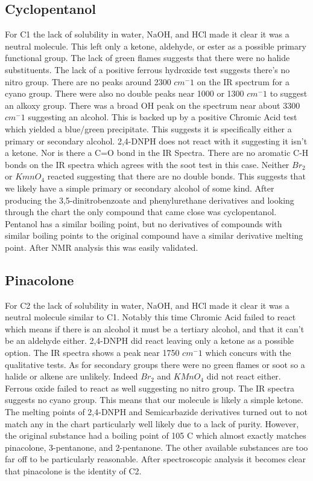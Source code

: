 \documentclass{article}
\begin{document}
	\subsection{Cyclopentanol}
	For C1 the lack of solubility in water, NaOH, and HCl made it clear it was a neutral molecule. This left only a ketone, aldehyde, or ester as a possible primary functional group. The lack of green flames suggests that there were no halide substituents. The lack of a positive ferrous hydroxide test suggests there's no nitro group. There are no peaks around 2300 $cm^-1$ on the IR spectrum for a cyano group. There were also no double peaks near 1000 or 1300 $cm^-1$ to suggest an alkoxy group. There was a broad OH peak on the spectrum near about 3300 $cm^-1$ suggesting an alcohol. This is backed up by a positive Chromic Acid test which yielded a blue/green precipitate. This suggests it is specifically either a primary or secondary alcohol. 2,4-DNPH does not react with it suggesting it isn't a ketone. Nor is there a C=O bond in the IR Spectra. There are no aromatic C-H bonds on the IR spectra which agrees with the soot test in this case. Neither $Br_2$ or $KmnO_4$ reacted suggesting that there are no double bonds. This suggests that we likely have a simple primary or secondary alcohol of some kind. After producing the 3,5-dinitrobenzoate and phenylurethane derivatives and looking through the chart the only compound that came close was cyclopentanol. Pentanol has a similar boiling point, but no derivatives of compounds with similar boiling points to the original compound have a similar derivative melting point. After NMR analysis this was easily validated.
	
	\subsection{Pinacolone}
	For C2 the lack of solubility in water, NaOH, and HCl made it clear it was a neutral molecule similar to C1. Notably this time Chromic Acid failed to react which means if there is an alcohol it must be a tertiary alcohol, and that it can't be an aldehyde either. 2,4-DNPH did react leaving only a ketone as a possible option. The IR spectra shows a peak near 1750 $cm^-1$ which concurs with the qualitative tests. As for secondary groups there were no green flames or soot so a halide or alkene are unlikely. Indeed $Br_2$ and $KMnO_4$ did not react either. Ferrous oxide failed to react as well suggesting no nitro group. The IR spectra suggests no cyano group. This means that our molecule is likely a simple ketone. The melting points of 2,4-DNPH and Semicarbazide derivatives turned out to not match any in the chart particularly well likely due to a lack of purity. However, the original substance had a boiling point of 105 C which almost exactly matches pinacolone, 3-pentanone, and 2-pentanone. The other available substances are too far off to be particularly reasonable. After spectroscopic analysis it becomes clear that pinacolone is the identity of C2.
	
\end{document}
